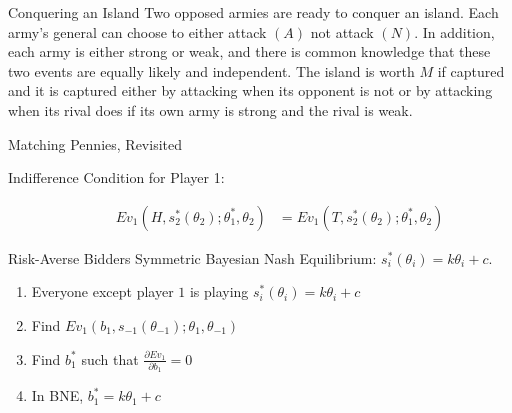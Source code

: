 \documentclass[8pt]{extarticle}
\title{}
\author{}
\date{}
\begin{document}
  \begin{problem}{Conquering an Island}
    Two opposed armies are ready to conquer an island. Each army's general can choose to either attack $(A)$ not attack $(N)$. In addition, each army is either strong or weak, and there is common knowledge that these two events are equally likely and independent. The island is worth $M$ if captured and it is captured either by attacking when its opponent is not or by attacking when its rival does if its own army is strong and the rival is weak. 
    \tcblower
  \end{problem}
  \begin{problem}{Matching Pennies, Revisited}
    \begin{description}
      \item[Indifference Condition for Player 1:]
        \begin{align*}
          Ev_{1}(H,s_2^{\ast}(\theta_2);\theta_1^{\ast},\theta_2) &= Ev_{1}(T,s_2^{\ast}(\theta_2);\theta_1^{\ast},\theta_2)
        \end{align*}
    \end{description}
  \end{problem}
  \begin{problem}{Risk-Averse Bidders}
    Symmetric Bayesian Nash Equilibrium: $s_i^{\ast}(\theta_i) = k\theta_i + c$.
    \begin{enumerate}[(1)]
      \item Everyone except player $1$ is playing $s_i^{\ast}(\theta_i) = k\theta_i + c$
      \item Find $Ev_{1}(b_1,s_{-1}(\theta_{-1});\theta_1,\theta_{-1})$
      \item Find $b_1^{\ast}$ such that $\frac{\partial Ev_1}{\partial b_1} = 0$
      \item In BNE, $b_1^{\ast} = k\theta_1 + c$
    \end{enumerate}
  \end{problem}
\end{document}

